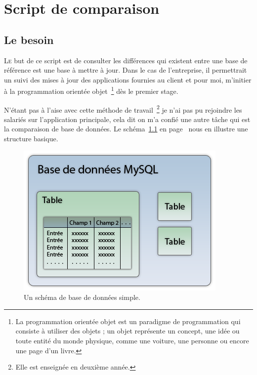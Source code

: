 \chapter{Script de comparaison} %
\label{cha:Script de comparaison}

\section{Le besoin} %
\label{sec:Le besoin}

\lettrine{L}{e} but de ce script est de consulter les différences qui
existent entre une base de référence est une base à mettre à jour. Dans
le cas de l'entreprise, il permettrait un suivi des mises à jour des
applications fournies au client et pour moi, m'initier à la
programmation orientée objet\, \footnote{La programmation orientée objet
est un paradigme de programmation qui consiste à utiliser des objets ;
un objet représente un concept, une idée ou toute entité du monde
physique, comme une voiture, une personne ou encore une page d'un
livre.} dès le premier stage.

N'étant pas à l'aise avec cette méthode de travail\, \footnote{Elle est
enseignée en deuxième année.} je n'ai pas pu rejoindre les salariés sur
l'application principale, cela dit on m'a confié une autre tâche qui est
la comparaison de base de données. Le schéma~\ref{bdd} en
page~\pageref{bdd} nous en illustre une structure basique.

\begin{figure}
    \begin{center}
        \includegraphics[scale=0.7]{images/bdd.png}
        \caption{Un schéma de base de données simple.}
        \label{bdd}
    \end{center}
\end{figure}

